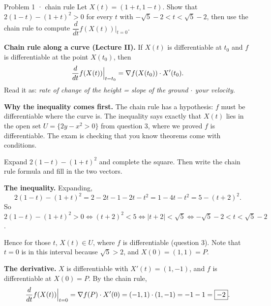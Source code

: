\begin{question}{Problem 1 \;·\; chain rule}
Let $X(t)=(1+t,1-t)$. Show that $2(1-t)-(1+t)^2>0$ for every $t$ with
$-\sqrt5-2<t<\sqrt5-2$, then use the chain rule to compute
$\dfrac{d}{dt}f(X(t))\Big|_{t=0}$.
\end{question}

\begin{lesson}
\textbf{Chain rule along a curve (Lecture II).} If $X(t)$ is differentiable at $t_0$ and $f$ is
differentiable at the point $X(t_0)$, then
\[
  \frac{d}{dt}f(X(t))\Big|_{t=t_0}=\nabla f(X(t_0))\cdot X'(t_0).
\]
Read it as: \emph{rate of change of the height = slope of the ground $\cdot$ your velocity}.

\smallskip
\textbf{Why the inequality comes first.} The chain rule has a hypothesis: $f$ must be
differentiable where the curve is. The inequality says exactly that $X(t)$ lies in the open set
$U=\{2y-x^2>0\}$ from question 3, where we proved $f$ is differentiable. The exam is checking that
you know theorems come with conditions.
\end{lesson}

\begin{howto}
Expand $2(1-t)-(1+t)^2$ and complete the square. Then write the chain rule formula and fill in
the two vectors.
\end{howto}

\begin{answer}
\textbf{The inequality.} Expanding,
\[
  2(1-t)-(1+t)^2=2-2t-1-2t-t^2=1-4t-t^2=5-(t+2)^2 .
\]
So $2(1-t)-(1+t)^2>0\iff (t+2)^2<5\iff |t+2|<\sqrt5\iff -\sqrt5-2<t<\sqrt5-2$.

Hence for those $t$, $X(t)\in U$, where $f$ is differentiable (question 3). Note that $t=0$ is in
this interval because $\sqrt5>2$, and $X(0)=(1,1)=P$.

\textbf{The derivative.} $X$ is differentiable with $X'(t)=(1,-1)$, and $f$ is differentiable at
$X(0)=P$. By the chain rule,
\[
  \frac{d}{dt}f(X(t))\Big|_{t=0}=\nabla f(P)\cdot X'(0)=(-1,1)\cdot(1,-1)=-1-1=\boxed{-2}.
\]
\end{answer}


